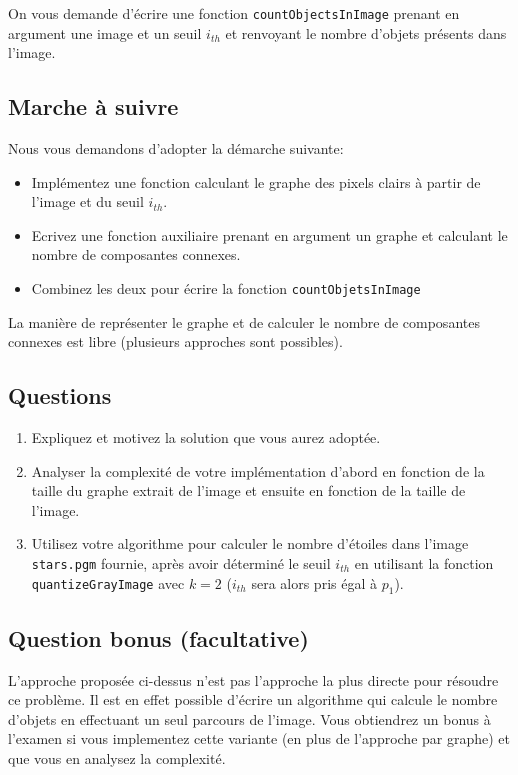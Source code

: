 \documentclass[a4paper,10pt]{article}
\begin{document}
On vous demande d'écrire une fonction \texttt{countObjectsInImage}
prenant en argument une image et un seuil $i_{th}$ et renvoyant le
nombre d'objets présents dans l'image.

\subsection*{Marche à suivre}

Nous vous demandons d'adopter la démarche suivante:
\begin{itemize}
\item Implémentez une fonction calculant le graphe des pixels clairs à partir de l'image et du seuil $i_{th}$.
\item Ecrivez une fonction auxiliaire prenant en argument un graphe et calculant le nombre de composantes connexes.
\item Combinez les deux pour écrire la fonction \texttt{countObjetsInImage}
\end{itemize}
La manière de représenter le graphe et de calculer le nombre de composantes connexes est libre (plusieurs approches sont possibles).

\subsection*{Questions}

\begin{enumerate}
\item Expliquez et motivez la solution que vous aurez adoptée.
\item Analyser la complexité de votre implémentation d'abord en fonction de la
  taille du graphe extrait de l'image et ensuite en fonction de la taille de
  l'image.
\item Utilisez votre algorithme pour calculer le nombre d'étoiles dans
  l'image \texttt{stars.pgm} fournie, après avoir déterminé le seuil
  $i_{th}$ en utilisant la fonction \texttt{quantizeGrayImage} avec
  $k=2$ ($i_{th}$ sera alors pris égal à $p_1$).
\end{enumerate}

\subsection*{Question bonus (facultative)}

L'approche proposée ci-dessus n'est pas l'approche la plus directe
pour résoudre ce problème. Il est en effet possible d'écrire un
algorithme qui calcule le nombre d'objets en effectuant un seul
parcours de l'image. Vous obtiendrez un bonus à l'examen si vous
implementez cette variante (en plus de l'approche par graphe) et que
vous en analysez la complexité.
\end{document}
